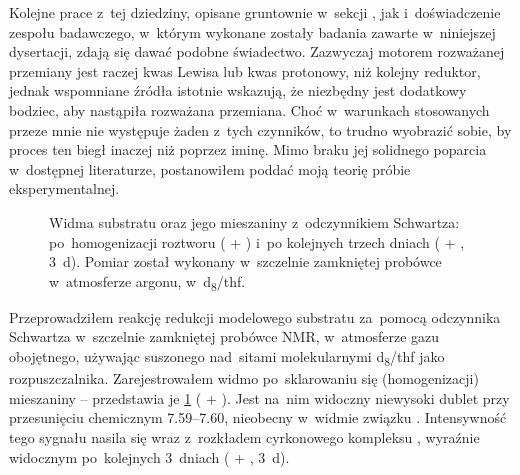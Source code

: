 Kolejne prace z~tej dziedziny, opisane gruntownie w~sekcji ,
  jak i~doświadczenie zespołu badawczego, w~którym wykonane zostały badania zawarte
  w~niniejszej dysertacji, zdają się dawać podobne świadectwo.
Zazwyczaj motorem rozważanej przemiany jest raczej kwas Lewisa lub kwas protonowy,
  niż kolejny reduktor, jednak wspomniane źródła istotnie wskazują,
  że niezbędny jest dodatkowy bodziec, aby nastąpiła rozważana przemiana.
Choć w~warunkach stosowanych przeze mnie nie występuje żaden z~tych czynników, to trudno wyobrazić sobie, by proces ten biegł inaczej niż poprzez iminę.
Mimo braku jej solidnego poparcia w~dostępnej literaturze, postanowiłem poddać moją teorię
  próbie eksperymentalnej.

\begin{figure}
  
  \caption{
    Widma \NMR*{} substratu  oraz jego mieszaniny z~odczynnikiem Schwartza:
      po~homogenizacji roztworu ( + ) i~po kolejnych trzech dniach
      ( + , \SI{3}{\day}).
    Pomiar został wykonany w~szczelnie zamkniętej probówce w~atmosferze argonu,
      w~d\textsubscript{8}\-/\acrshort{thf}.
  }\label{fig:nmr-imine-trace}
\end{figure}

\begin{marginfigure}[-17.5em]
  
  \caption{
    Zbliżenie na~dublet widoczny na~\protect\cref{fig:nmr-imine-trace}, będący najpewniej
      sygnałem pochodzącym od~iminowego protonu, zaznaczonego zielonym kolorem w~strukturze
      na~\protect\cref{sch:zr-to-imine} (struktura~).
  }\label{fig:nmr-imine-expand}
\end{marginfigure}

Przeprowadziłem reakcję redukcji modelowego substratu  za~pomocą odczynnika
  Schwartza w~szczelnie zamkniętej probówce NMR, w~atmosferze gazu obojętnego, używając
  suszonego nad~sitami molekularnymi d\textsubscript{8}\-/\acrshort{thf} jako rozpuszczalnika.
Zarejestrowałem widmo \NMR*{} po~sklarowaniu się (homogenizacji) mieszaniny \--- przedstawia
  je \cref{fig:nmr-imine-trace} ( + ).
Jest na~nim widoczny niewysoki dublet przy przesunięciu chemicznym \SIrange{7.59}{7.60}{\ppm},
  nieobecny w~widmie związku .
Intensywność tego sygnału nasila się wraz z~rozkładem cyrkonowego kompleksu ,
  wyraźnie widocznym po~kolejnych 3~dniach
  ( + , \SI{3}{\day}).

